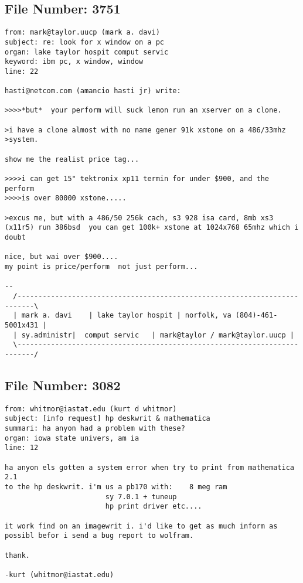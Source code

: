 \subsection{File Number: 3751}
\begin{verbatim}
from: mark@taylor.uucp (mark a. davi)
subject: re: look for x window on a pc
organ: lake taylor hospit comput servic
keyword: ibm pc, x window, window
line: 22

hasti@netcom.com (amancio hasti jr) write:

>>>>*but*  your perform will suck lemon run an xserver on a clone.

>i have a clone almost with no name gener 91k xstone on a 486/33mhz
>system.

show me the realist price tag...

>>>>i can get 15" tektronix xp11 termin for under $900, and the perform
>>>>is over 80000 xstone.....

>excus me, but with a 486/50 256k cach, s3 928 isa card, 8mb xs3 (x11r5) run 386bsd  you can get 100k+ xstone at 1024x768 65mhz which i doubt 

nice, but wai over $900....
my point is price/perform  not just perform...

-- 
  /--------------------------------------------------------------------------\
  | mark a. davi    | lake taylor hospit | norfolk, va (804)-461-5001x431 |
  | sy.administr|  comput servic   | mark@taylor / mark@taylor.uucp |
  \--------------------------------------------------------------------------/
\end{verbatim}
\subsection{File Number: 3082}
\begin{verbatim}
from: whitmor@iastat.edu (kurt d whitmor)
subject: [info request] hp deskwrit & mathematica
summari: ha anyon had a problem with these?
organ: iowa state univers, am ia
line: 12

ha anyon els gotten a system error when try to print from mathematica 2.1
to the hp deskwrit. i'm us a pb170 with:	8 meg ram
						sy 7.0.1 + tuneup
						hp print driver etc....

it work find on an imagewrit i. i'd like to get as much inform as
possibl befor i send a bug report to wolfram.

thank.

-kurt (whitmor@iastat.edu)

\end{verbatim}
